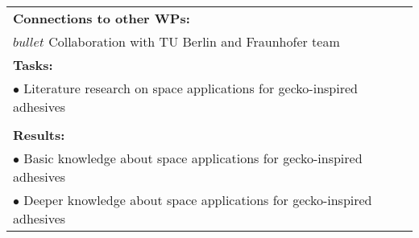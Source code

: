 \begin{table}[!h]
\begin{center}
\begin{tabular}{|p{}||p{}|p{}||p{}|}
            \multicolumn{4}{|p{.95\columnwidth}|}{\textbf{Connections to other WPs:}}\\
            \multicolumn{4}{|p{.95\columnwidth}|}{$bullet$ Collaboration with TU Berlin and Fraunhofer team}\\
            \multicolumn{4}{|p{.95\columnwidth}|}{\textbf{Tasks:}}\\
            \multicolumn{4}{|p{.95\columnwidth}|}{$\bullet$ Literature research on space applications for gecko-inspired adhesives}\\
            \multicolumn{4}{|p{.95\columnwidth}|}{}\\
            \multicolumn{4}{|p{.95\columnwidth}|}{\textbf{Results:}}\\
            \multicolumn{4}{|p{.95\columnwidth}|}{$\bullet$ Basic knowledge about space applications for gecko-inspired adhesives}\\
            \multicolumn{4}{|p{.95\columnwidth}|}{$\bullet$ Deeper knowledge about space applications for gecko-inspired adhesives}\\
            \hline
        \end{tabular}
    \end{center}
\end{table}

\clearpage

